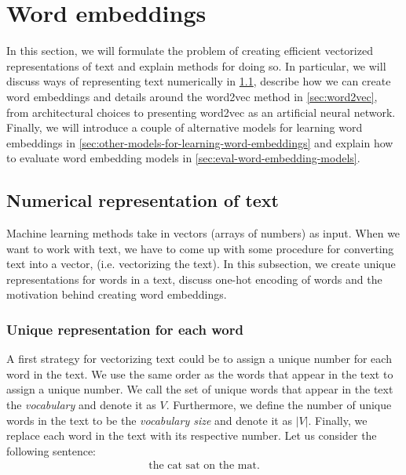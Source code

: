 \section{Word embeddings}
\label{sec:word-embeddings}
In this section, we will formulate the problem of creating efficient vectorized representations of text and explain methods for doing so. In particular, we will discuss ways of representing text numerically in \cref{sec:numerical-repr-of-text}, describe how we can create word embeddings and details around the word2vec method in \cref{sec:word2vec}, from architectural choices to presenting word2vec as an artificial neural network. Finally, we will introduce a couple of alternative models for learning word embeddings in \cref{sec:other-models-for-learning-word-embeddings} and explain how to evaluate word embedding models in \cref{sec:eval-word-embedding-models}.

\subsection{Numerical representation of text}
\label{sec:numerical-repr-of-text}
Machine learning methods take in vectors (arrays of numbers) as input. When we want to work with text, we have to come up with some procedure for converting text into a vector, (i.e. vectorizing the text).
In this subsection, we create unique representations for words in a text, discuss one-hot encoding of words and the motivation behind creating word embeddings.

\subsubsection{Unique representation for each word}
\label{unique-representation-for-each-word}
A first strategy for vectorizing text could be to assign a unique number for each word in the text. We use the same order as the words that appear in the text to assign a unique number. We call the set of unique words that appear in the text the \textit{vocabulary} and denote it as $V$. Furthermore, we define the number of unique words in the text to be the \textit{vocabulary size} and denote it as $|V|$. Finally, we replace each word in the text with its respective number. Let us consider the following sentence:
\begin{align}
    \text{the cat sat on the mat}.
    \label{txt:num-rep-ex-sent-words}
\end{align}

